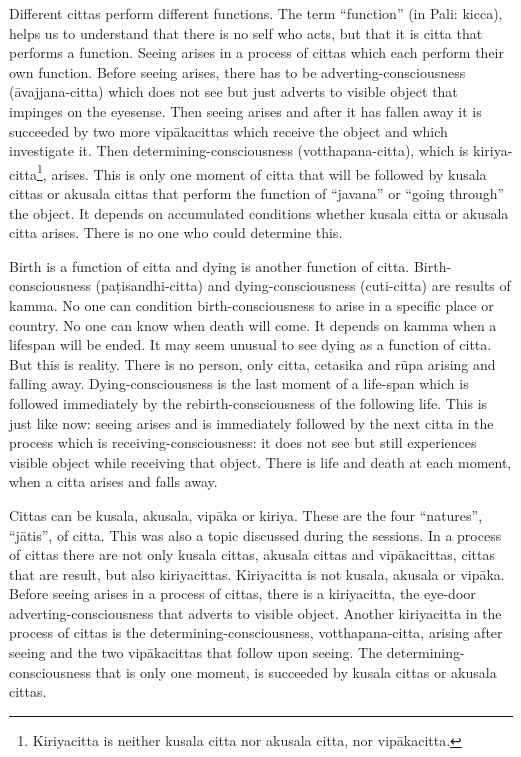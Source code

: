 Different cittas perform different functions. The term ``function'' (in
Pali: kicca), helps us to understand that there is no self who acts, but
that it is citta that performs a function. Seeing arises in a process of
cittas which each perform their own function. Before seeing arises,
there has to be adverting-consciousness (āvajjana-citta) which does not
see but just adverts to visible object that impinges on the eyesense.
Then seeing arises and after it has fallen away it is succeeded by two
more vipākacittas which receive the object and which investigate it.
Then determining-consciousness (votthapana-citta), which is kiriya-citta\footnote{Kiriyacitta is neither
kusala citta nor akusala citta, nor vipākacitta.}, arises. This is only one
moment of citta that will be followed by kusala cittas or akusala cittas
that perform the function of ``javana'' or ``going through'' the object.
It depends on accumulated conditions whether kusala citta or akusala
citta arises. There is no one who could determine this.

Birth is a function of citta and dying is another function of citta.
Birth-consciousness (paṭisandhi-citta) and dying-consciousness
(cuti-citta) are results of kamma. No one can condition
birth-consciousness to arise in a specific place or country. No one can
know when death will come. It depends on kamma when a lifespan will be
ended. It may seem unusual to see dying as a function of citta. But this
is reality. There is no person, only citta, cetasika and rūpa arising
and falling away. Dying-consciousness is the last moment of a life-span
which is followed immediately by the rebirth-consciousness of the
following life. This is just like now: seeing arises and is immediately
followed by the next citta in the process which is
receiving-consciousness: it does not see but still experiences visible
object while receiving that object. There is life and death at each
moment, when a citta arises and falls away.

Cittas can be kusala, akusala, vipāka or kiriya. These are the four
``natures'', ``jātis'', of citta. This was also a topic discussed during
the sessions. In a process of cittas there are not only kusala cittas,
akusala cittas and vipākacittas, cittas that are result, but also
kiriyacittas. Kiriyacitta is not kusala, akusala or vipāka. Before
seeing arises in a process of cittas, there is a kiriyacitta, the
eye-door adverting-consciousness that adverts to visible object. Another
kiriyacitta in the process of cittas is the determining-consciousness,
votthapana-citta, arising after seeing and the two vipākacittas that
follow upon seeing. The determining-consciousness that is only one
moment, is succeeded by kusala cittas or akusala cittas.

